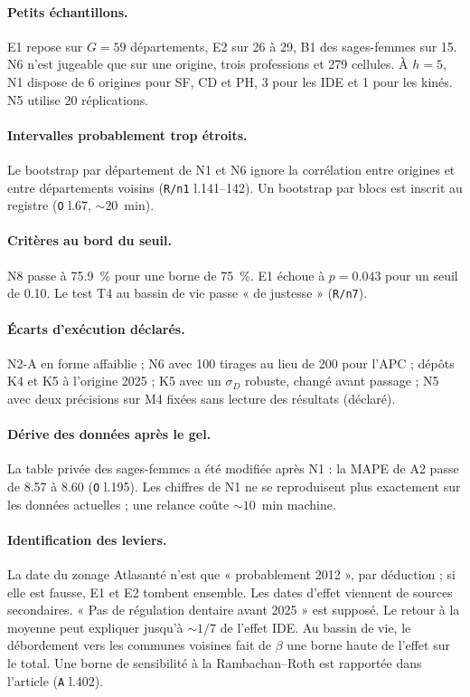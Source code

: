 \paragraph{Petits échantillons.} E1 repose sur $G = 59$\mesure{} départements, E2 sur 26 à
29\mesure, B1 des sages-femmes sur 15\mesure. N6 n'est jugeable que sur une origine, trois
professions et 279\derive{} cellules. À $h = 5$, N1 dispose de 6\derive{} origines pour SF, CD et
PH, 3\derive{} pour les IDE et 1\derive{} pour les kinés. N5 utilise 20\suppose{} réplications.

\paragraph{Intervalles probablement trop étroits.} Le bootstrap par département de N1 et N6
ignore la corrélation entre origines et entre départements voisins (\texttt{R/n1} l.141--142). Un
bootstrap par blocs est inscrit au registre (\texttt{O} l.67, $\sim 20$\suppose{}~min).

\paragraph{Critères au bord du seuil.} N8 passe à \num{75.9}\mesure{}~\% pour une borne de
75\suppose{}~\%. E1 échoue à $p = \num{0.043}$\mesure{} pour un seuil de \num{0.10}\suppose. Le
test T4 au bassin de vie passe « de justesse » (\texttt{R/n7}).

\paragraph{Écarts d'exécution déclarés.} N2-A en forme affaiblie ; N6 avec 100\mesure{} tirages
au lieu de 200\suppose{} pour l'APC ; dépôts K4 et K5 à l'origine 2025 ; K5 avec un $\sigma_D$
robuste, changé avant passage ; N5 avec deux précisions sur M4 fixées sans lecture des résultats
(déclaré).

\paragraph{Dérive des données après le gel.} La table privée des sages-femmes a été modifiée après
N1 : la MAPE de A2 passe de \num{8.57} à \num{8.60}\mesure{} (\texttt{O} l.195). Les chiffres de N1
ne se reproduisent plus exactement sur les données actuelles ; une relance coûte
$\sim 10$\suppose{}~min machine.

\paragraph{Identification des leviers.} La date du zonage Atlasanté \citep{atlasante2014zonage}
n'est que « probablement 2012 », par déduction ; si elle est fausse, E1 et E2 tombent ensemble.
Les dates d'effet viennent de sources secondaires. « Pas de régulation dentaire avant 2025 » est
supposé. Le retour à la moyenne peut expliquer jusqu'à $\sim 1/7$\derive{} de l'effet IDE. Au
bassin de vie, le débordement vers les communes voisines fait de $\beta$ une borne haute de
l'effet sur le total. Une borne de sensibilité à la Rambachan--Roth \citep{rambachan2023} est
rapportée dans l'article (\texttt{A} l.402).

